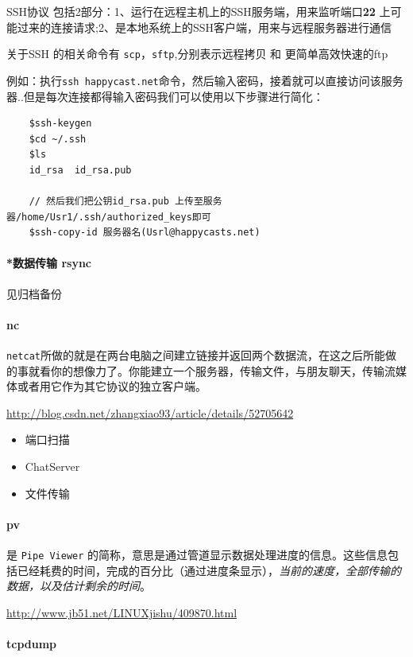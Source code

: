 \documentclass[UTF8,a4paper,12pt]{ctexbook}
\begin{document}
				SSH协议 包括2部分：1、运行在远程主机上的SSH服务端，用来监听端口\textbf{22} 上可能过来的连接请求;2、是本地系统上的SSH客户端，用来与远程服务器进行通信
				
			关于SSH 的相关命令有 \verb|scp|，\verb|sftp|,分别表示远程拷贝 和 更简单高效快速的ftp
			
			例如：执行\verb|ssh happycast.net|命令，然后输入密码，接着就可以直接访问该服务器..但是每次连接都得输入密码我们可以使用以下步骤进行简化：
				\begin{lstlisting}
	$ssh-keygen
	$cd ~/.ssh
	$ls
	id_rsa  id_rsa.pub
	
	// 然后我们把公钥id_rsa.pub 上传至服务器/home/Usr1/.ssh/authorized_keys即可
	$ssh-copy-id 服务器名(Usrl@happycasts.net)
				\end{lstlisting}
			
			\paragraph{*数据传输 rsync}见归档备份
			
			\paragraph{nc}\verb|netcat|所做的就是在两台电脑之间建立链接并返回两个数据流，在这之后所能做的事就看你的想像力了。你能建立一个服务器，传输文件，与朋友聊天，传输流媒体或者用它作为其它协议的独立客户端。
				
				\url{http://blog.csdn.net/zhangxiao93/article/details/52705642}
				\begin{itemize}[itemindent = 1em]
					\item 端口扫描
					\item ChatServer
					\item 文件传输
				\end{itemize}
				
			\paragraph{pv}是 \verb|Pipe Viewer| 的简称，意思是通过管道显示数据处理进度的信息。这些信息包括已经耗费的时间，完成的百分比（通过进度条显示），\textit{当前的速度，全部传输的数据，以及估计剩余的时间}。
			
				\url{http://www.jb51.net/LINUXjishu/409870.html}
				
			\paragraph{tcpdump}
				
\end{document}
